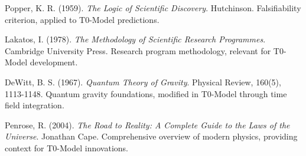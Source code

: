 \documentclass[12pt,a4paper]{report}
\begin{document}
\begin{thebibliography}{50}
		Popper, K. R. (1959). \textit{The Logic of Scientific Discovery}. Hutchinson. Falsifiability criterion, applied to T0-Model predictions.
		
		Lakatos, I. (1978). \textit{The Methodology of Scientific Research Programmes}. Cambridge University Press. Research program methodology, relevant for T0-Model development.
		
		DeWitt, B. S. (1967). \textit{Quantum Theory of Gravity}. Physical Review, 160(5), 1113-1148. Quantum gravity foundations, modified in T0-Model through time field integration.
		
		Penrose, R. (2004). \textit{The Road to Reality: A Complete Guide to the Laws of the Universe}. Jonathan Cape. Comprehensive overview of modern physics, providing context for T0-Model innovations.
		
	\end{thebibliography}
\end{document}
